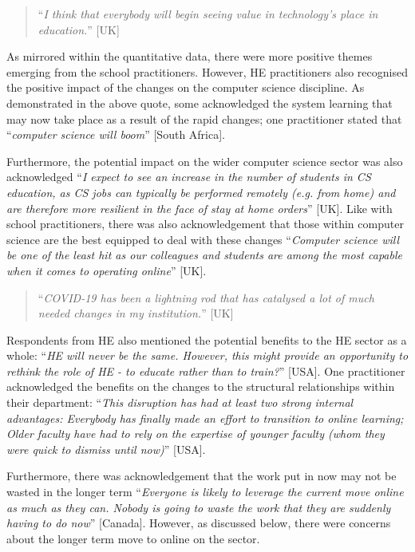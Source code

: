 \documentclass[sigconf]{acmart}
\begin{document}
\begin{quotation}
``{\emph{I think that everybody will begin seeing value in
    technology’s place in education.}}'' [UK]
\end{quotation}


As mirrored within the quantitative data, there were more positive
themes emerging from the school practitioners. However, HE
practitioners also recognised the positive impact of the changes on
the computer science discipline. As demonstrated in the above quote,
some acknowledged the system learning that may now take place as a
result of the rapid changes; one practitioner stated that
``{\emph{computer science will boom}}'' [South Africa].

Furthermore, the potential impact on the wider computer science sector
was also acknowledged ``{\emph{I expect to see an increase in the
number of students in CS education, as CS jobs can typically be
performed remotely (e.g. from home) and are therefore more resilient
in the face of stay at home orders}}'' [UK]. Like with school
practitioners, there was also acknowledgement that those within
computer science are the best equipped to deal with these changes
``{\emph{Computer science will be one of the least hit as our
colleagues and students are among the most capable when it comes to
operating online}}'' [UK].

\begin{quotation}
``{\emph{COVID-19 has been a lightning rod that has catalysed a lot of
    much needed changes in my institution.}}'' [UK]
\end{quotation}

Respondents from HE also mentioned the potential benefits to the HE
sector as a whole: ``{\emph{HE will never be the same. However, this
might provide an opportunity to rethink the role of HE - to educate
rather than to train?}}'' [USA]. One practitioner acknowledged the
benefits on the changes to the structural relationships within their
department: ``{\emph{This disruption has had at least two strong
internal advantages: Everybody has finally made an effort to
transition to online learning; Older faculty have had to rely on the
expertise of younger faculty (whom they were quick to dismiss until
now)}}'' [USA].

Furthermore, there was acknowledgement that the work put in now may
not be wasted in the longer term ``{\emph{Everyone is likely to
leverage the current move online as much as they can. Nobody is going
to waste the work that they are suddenly having to do now}}''
[Canada]. However, as discussed below, there were concerns about the
longer term move to online on the sector.
\end{document}
